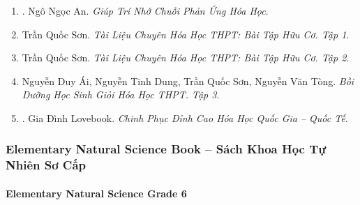 \documentclass{article}
\begin{document}
\begin{enumerate}
	\item \cite{An_chuoi_PUHH}. Ngô Ngọc An. {\it Giúp Trí Nhớ Chuỗi Phản Ứng Hóa Học}.\hfill{\sf[reading]}
	
	\item Trần Quốc Sơn. {\it Tài Liệu Chuyên Hóa Học THPT: Bài Tập Hữu Cơ. Tập 1}.
	
	\item Trần Quốc Sơn. {\it Tài Liệu Chuyên Hóa Học THPT: Bài Tập Hữu Cơ. Tập 2}.
	
	\item Nguyễn Duy Ái, Nguyễn Tinh Dung, Trần Quốc Sơn, Nguyễn Văn Tòng. {\it Bồi Dưỡng Học Sinh Giỏi Hóa Học THPT. Tập 3}.
	
	\item \cite{Lovebook2022}. Gia Đình Lovebook. {\it Chinh Phục Đỉnh Cao Hóa Học Quốc Gia -- Quốc Tế}.\hfill{\sf[reading]}
\end{enumerate}

\subsubsection{Elementary Natural Science Book -- Sách Khoa Học Tự Nhiên Sơ Cấp}

\paragraph{Elementary Natural Science Grade 6}
\end{document}
